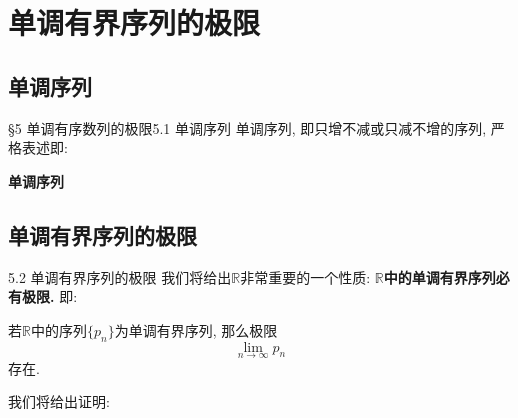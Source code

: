 \documentclass[serif]{beamer}
\begin{document}
\section{\heiti 单调有界序列的极限}
\subsection{\kaishu 单调序列}

\begin{frame}{\S5 单调有序数列的极限}{5.1 单调序列}
	单调序列, 即只增不减或只减不增的序列, 严格表述即: \par
	\textbf{单调序列}
\end{frame}

\subsection{\kaishu 单调有界序列的极限}

\begin{frame}{5.2 单调有界序列的极限}
	我们将给出$\mathbb{R}$非常重要的一个性质: \textbf{$\mathbb{R}$中的单调有界序列必有极限.}
	即:\par
	若$\mathbb{R}$中的序列$\{p_n\}$为单调有界序列, 那么极限
	\[\lim\limits_{n\to\infty}p_n\]
	存在.\par
	我们将给出证明:
\end{frame}
\end{document}
